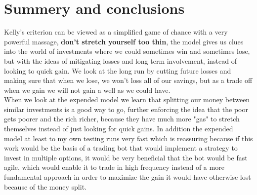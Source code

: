 \documentclass{article}
\begin{document}
	\section{Summery and conclusions}
	Kelly's criterion can be viewed as a simplified game of chance with a very powerful massage, 
	\textbf{don't stretch yourself too thin}, the model gives us clues into the world of investments where we could sometimes win and sometimes lose, but with the ideas of mitigating losses and long term involvement, instead of looking to quick gain. We look at the long run by cutting future losses and making sure that when we lose, we won't loss all of our savings, but as a trade off when we gain we will not gain a well as we could have.\\
	When we look at the expended model we learn that splitting our money between similar investments is a good way to go, further enforcing the idea that the poor gets poorer and the rich richer, because they have much more "gas" to stretch themselves instead of just looking for quick gains. In addition the expended model at least to my own testing runs very fast which is reassuring because if this work would be the basis of a trading bot that would implement a strategy to invest in multiple options, it would be very beneficial that the bot would be fast agile, which would enable it to trade in high frequency instead of a more fundamental approach in order to maximize the gain it would have otherwise lost because of the money split.
	\newpage
	\printbibliography[
	heading=bibintoc,
	title={References}
	]
\end{document}
